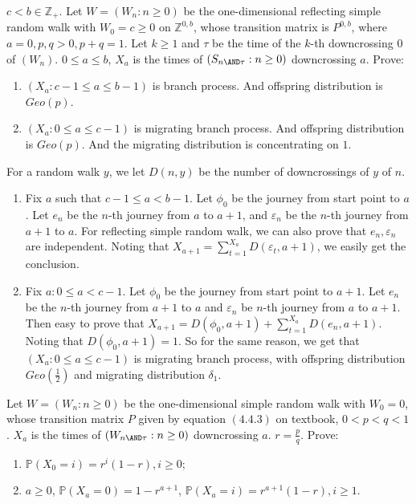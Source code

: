 \documentclass{ctexart}
\begin{document}
\begin{problem}\label{pro:2}
  \(c < b \in \mathbb{Z}_+\). Let \(W=(W_n :n \geq 0)\) be the one-dimensional reflecting simple
  random walk with \(W_0=c \geq 0\) on \(\mathbb{Z}^{0,b}\), whose transition matrix is \(P^{0,b}\), where
  \(a = 0,p,q >0, p + q =1\).
  Let \(k \geq 1\) and \(\tau\) be the time of the \(k\)-th downcrossing \(0\) of \((W_n)\).
  \(0 \leq a \leq b\),
  \(X_a\) is the times of \((S_{n \AND \tau}:n \geq 0)\) downcrossing \(a\). Prove:
  \begin{enumerate}
    \item \((X_a:c-1 \leq a \leq b-1)\) is branch process.
      And offspring distribution is \(Geo(p)\).
    \item \((X_a:0 \leq a \leq c-1)\) is migrating branch process.
      And offspring distribution is \(Geo(p)\).
      And the migrating distribution is concentrating on \(1\).
  \end{enumerate}
\end{problem}
\begin{solution}
  For a random walk \(y\), we let \(D(n,y)\) be the number of downcrossings of \(y\) of \(n\).
  \begin{enumerate}
    \item Fix \(a\) such that \(c-1 \leq a < b-1\).
      Let \(\phi_0\) be the journey from start point to \(a\).
      Let \(e_n\) be the \(n\)-th journey from \(a\) to \(a+1\), and \(\varepsilon_n\) be the \(n\)-th journey from \(a+1\) to \(a\).
      For reflecting simple random walk, we can also prove that \(e_n,\varepsilon_n\) are independent.
      Noting that \(X_{a+1}=\sum_{t=1}^{X_a} D(\varepsilon_t,a+1)\), we easily get the conclusion.
    \item Fix \(a:0 \leq a<c-1\). Let \(\phi_0\) be the journey from start point to \(a+1\).
      Let \(e_n\) be the \(n\)-th journey from \(a+1\) to \(a\) and \(\varepsilon_n\) be \(n\)-th journey from \(a\) to \(a+1\).
      Then easy to prove that \(X_{a+1}=D(\phi_0,a+1)+\sum_{t=1}^{X_a} D(e_n,a+1)\).
      Noting that \(D(\phi_0,a+1)=1\). So for the same reason, we get that \((X_a:0 \leq a \leq c-1)\) is migrating branch process,
      with offspring distribution \(Geo(\frac{1}{2})\) and migrating distribution \(\delta_1\).
  \end{enumerate}
\end{solution}
\begin{problem}\label{pro:3}
  Let \(W=(W_n:n \geq 0)\) be the one-dimensional simple random walk with \(W_0=0\),
  whose transition matrix \(P\) given by equation \((4.4.3)\)
  on textbook, \(0< p<q<1\).
  \(X_a\) is the times of \((W_{n \AND \tau}:n \geq 0)\) downcrossing \(a\).
  \(r=\frac{p}{q}\).
  Prove:
  \begin{enumerate}
    \item \label{ite:3.1} \(\mathbb{P}(X_0=i)=r^i(1-r),i \geq 0\);
    \item \(a \geq 0\), \(\mathbb{P}(X_a=0)=1-r^{a +1}\), \(\mathbb{P}(X_a=i)=r^{a + 1}(1 -r),i \geq 1\).
  \end{enumerate}
\end{problem}
\end{document}
